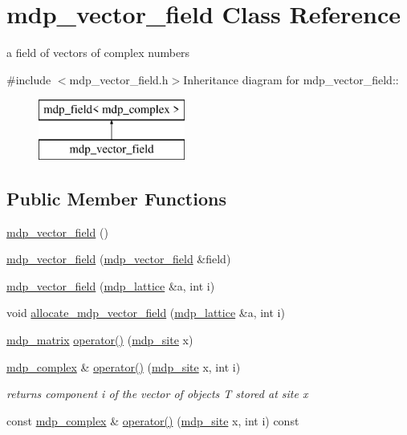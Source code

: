 \hypertarget{classmdp__vector__field}{
\section{mdp\_\-vector\_\-field Class Reference}
\label{classmdp__vector__field}
}


a field of vectors of complex numbers  


{\ttfamily \#include $<$mdp\_\-vector\_\-field.h$>$}Inheritance diagram for mdp\_\-vector\_\-field::\begin{figure}[H]
\begin{center}
\leavevmode
\includegraphics[height=2cm]{classmdp__vector__field}
\end{center}
\end{figure}
\subsection*{Public Member Functions}
\begin{DoxyCompactItemize}
\item 
\hyperlink{classmdp__vector__field_a3900cf2abf276128751407dc0795b312}{mdp\_\-vector\_\-field} ()
\item 
\hyperlink{classmdp__vector__field_ae565296f84d9187b093e4dd9d78577d9}{mdp\_\-vector\_\-field} (\hyperlink{classmdp__vector__field}{mdp\_\-vector\_\-field} \&field)
\item 
\hyperlink{classmdp__vector__field_ac43a21288e27c78d5bdde212fa9351d2}{mdp\_\-vector\_\-field} (\hyperlink{classmdp__lattice}{mdp\_\-lattice} \&a, int i)
\item 
void \hyperlink{classmdp__vector__field_ad8c24094484c978db191b9aab575d528}{allocate\_\-mdp\_\-vector\_\-field} (\hyperlink{classmdp__lattice}{mdp\_\-lattice} \&a, int i)
\item 
\hyperlink{classmdp__matrix}{mdp\_\-matrix} \hyperlink{classmdp__vector__field_aaa674fa7253c69257ca593d3854d1672}{operator()} (\hyperlink{classmdp__site}{mdp\_\-site} x)
\item 
\hyperlink{classmdp__complex}{mdp\_\-complex} \& \hyperlink{classmdp__vector__field_aa50ba6cb67e5978d0e362b70ea703164}{operator()} (\hyperlink{classmdp__site}{mdp\_\-site} x, int i)
\begin{DoxyCompactList}\small\item\em returns component i of the vector of objects T stored at site x \item\end{DoxyCompactList}\item 
const \hyperlink{classmdp__complex}{mdp\_\-complex} \& \hyperlink{classmdp__vector__field_a9e9eac5aef1e86f5ed72cba00dbf06be}{operator()} (\hyperlink{classmdp__site}{mdp\_\-site} x, int i) const 
\end{DoxyCompactItemize}
